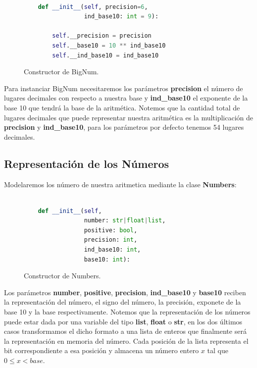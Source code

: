 \documentclass[a4paper,10pt,twocolumn]{article}
\begin{document}

\begin{figure}[htb]%
	\begin{lstlisting}[language=python]%

    def __init__(self, precision=6,
                 ind_base10: int = 9):
                 
        self.__precision = precision
        self.__base10 = 10 ** ind_base10
        self.__ind_base10 = ind_base10


			\end{lstlisting}
	\caption{Constructor de BigNum.\label{fig:code}}
\end{figure}

Para instanciar BigNum necesitaremos los parámetros \textbf{precision} el número de lugares decimales con respecto a nuestra base y \textbf{ind\_base10} el exponente de la base 10 que tendrá la base de la aritmética. Notemos que la cantidad total de lugares decimales que puede representar nuestra aritmética es la multiplicación de
\textbf{precision} y  \textbf{ind\_base10}, para los parámetros por defecto tenemos 54 lugares decimales.


\subsection{Representación de los Números}\label{sub:representation}
Modelaremos los número de nuestra aritmetica mediante la clase \textbf{Numbers}:

\begin{figure}[htb]%
	\begin{lstlisting}[language=python]%

    def __init__(self, 
                 number: str|float|list,         
                 positive: bool, 
                 precision: int, 
                 ind_base10: int, 
                 base10: int):

			\end{lstlisting}
	\caption{Constructor de Numbers.\label{fig:code}}
\end{figure}

Los parámetros \textbf{number}, \textbf{positive}, \textbf{precision}, \textbf{ind\_base10} y \textbf{base10}
reciben la representación del número, el signo del número, la precisión, exponete de la base 10 y la base respectivamente. Notemos que la representación de los números puede estar dada por una variable del tipo \textbf{list}, \textbf{float} o \textbf{str}, en los dos últimos casos transformamos el dicho formato a  una lista de enteros que finalmente será la representación en memoria del número. Cada posición de la lista representa el bit correspondiente a esa posición y almacena un número entero $x$ tal que $0\leq x <base$.  
\end{document}
